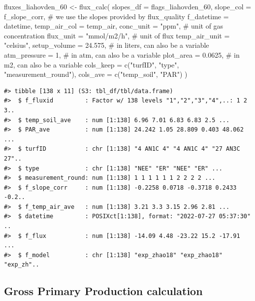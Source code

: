 \documentclass[
  letterpaper,
  DIV=11,
  numbers=noendperiod]{scrartcl}
\newenvironment{Shaded}{\begin{snugshade}}{\end{snugshade}}
\newcommand{\AttributeTok}[1]{\textcolor[rgb]{0.40,0.45,0.13}{#1}}
\newcommand{\CommentTok}[1]{\textcolor[rgb]{0.37,0.37,0.37}{#1}}
\newcommand{\DecValTok}[1]{\textcolor[rgb]{0.68,0.00,0.00}{#1}}
\newcommand{\FloatTok}[1]{\textcolor[rgb]{0.68,0.00,0.00}{#1}}
\newcommand{\FunctionTok}[1]{\textcolor[rgb]{0.28,0.35,0.67}{#1}}
\newcommand{\NormalTok}[1]{\textcolor[rgb]{0.00,0.23,0.31}{#1}}
\newcommand{\OtherTok}[1]{\textcolor[rgb]{0.00,0.23,0.31}{#1}}
\newcommand{\StringTok}[1]{\textcolor[rgb]{0.13,0.47,0.30}{#1}}
\begin{document}
\begin{Shaded}
\begin{Highlighting}[]
\NormalTok{fluxes\_liahovden\_60 }\OtherTok{\textless{}{-}} \FunctionTok{flux\_calc}\NormalTok{(}
  \AttributeTok{slopes\_df =}\NormalTok{ flags\_liahovden\_60,}
  \AttributeTok{slope\_col =}\NormalTok{ f\_slope\_corr, }\CommentTok{\# we use the slopes provided by flux\_quality}
  \AttributeTok{f\_datetime =}\NormalTok{ datetime,}
  \AttributeTok{temp\_air\_col =}\NormalTok{ temp\_air,}
  \AttributeTok{conc\_unit =} \StringTok{"ppm"}\NormalTok{, }\CommentTok{\# unit of gas concentration}
  \AttributeTok{flux\_unit =} \StringTok{"mmol/m2/h"}\NormalTok{, }\CommentTok{\# unit of flux}
  \AttributeTok{temp\_air\_unit =} \StringTok{"celsius"}\NormalTok{,}
  \AttributeTok{setup\_volume =} \FloatTok{24.575}\NormalTok{, }\CommentTok{\# in liters, can also be a variable}
  \AttributeTok{atm\_pressure =} \DecValTok{1}\NormalTok{, }\CommentTok{\# in atm, can also be a variable}
  \AttributeTok{plot\_area =} \FloatTok{0.0625}\NormalTok{, }\CommentTok{\# in m2, can also be a variable}
  \AttributeTok{cols\_keep =} \FunctionTok{c}\NormalTok{(}\StringTok{"turfID"}\NormalTok{, }\StringTok{"type"}\NormalTok{, }\StringTok{"measurement\_round"}\NormalTok{),}
  \AttributeTok{cols\_ave =} \FunctionTok{c}\NormalTok{(}\StringTok{"temp\_soil"}\NormalTok{, }\StringTok{"PAR"}\NormalTok{)}
\NormalTok{  )}
\end{Highlighting}
\end{Shaded}

\begin{verbatim}
#> tibble [138 x 11] (S3: tbl_df/tbl/data.frame)
#>  $ f_fluxid         : Factor w/ 138 levels "1","2","3","4",..: 1 2 3..
#>  $ temp_soil_ave    : num [1:138] 6.96 7.01 6.83 6.83 2.5 ...
#>  $ PAR_ave          : num [1:138] 24.242 1.05 28.809 0.403 48.062 ...
#>  $ turfID           : chr [1:138] "4 AN1C 4" "4 AN1C 4" "27 AN3C 27"..
#>  $ type             : chr [1:138] "NEE" "ER" "NEE" "ER" ...
#>  $ measurement_round: num [1:138] 1 1 1 1 1 1 2 2 2 2 ...
#>  $ f_slope_corr     : num [1:138] -0.2258 0.0718 -0.3718 0.2433 -0.2..
#>  $ f_temp_air_ave   : num [1:138] 3.21 3.3 3.15 2.96 2.81 ...
#>  $ datetime         : POSIXct[1:138], format: "2022-07-27 05:37:30" ..
#>  $ f_flux           : num [1:138] -14.09 4.48 -23.22 15.2 -17.91 ...
#>  $ f_model          : chr [1:138] "exp_zhao18" "exp_zhao18" "exp_zh"..
\end{verbatim}

\subsection{Gross Primary Production
calculation}\label{gross-primary-production-calculation}
\end{document}

